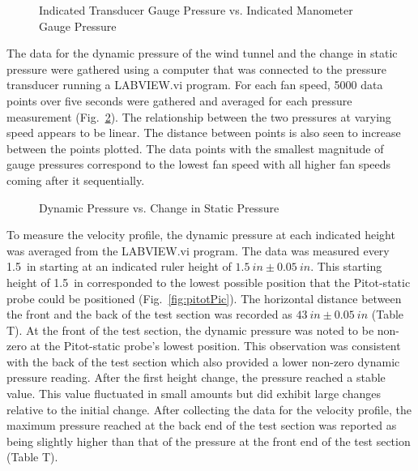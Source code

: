 \documentclass[journal,letterpaper]{IEEEtran}
\begin{document}
\begin{figure}[H]
    \centering
    
    \caption{Indicated Transducer Gauge Pressure vs. Indicated Manometer Gauge Pressure}
    \label{fig:calibration}
\end{figure}

The data for the dynamic pressure of the wind tunnel and the change in static pressure were gathered using a computer that was connected to the pressure transducer running a LABVIEW.vi program.
For each fan speed, 5000 data points over five seconds were gathered and averaged for each pressure measurement (Fig.~\ref{fig:data}).
The relationship between the two pressures at varying speed appears to be linear.
The distance between points is also seen to increase between the points plotted.
The data points with the smallest magnitude of gauge pressures correspond to the lowest fan speed with all higher fan speeds coming after it sequentially.

\begin{figure}[H]
    \centering
    
    \caption{Dynamic Pressure vs. Change in Static Pressure}
    \label{fig:data}
\end{figure}

To measure the velocity profile, the dynamic pressure at each indicated height was averaged from the LABVIEW.vi program.
The data was measured every \qty{1.5}{in} starting at an indicated ruler height of $\qty{1.5}{in} \pm \qty{0.05}{in}$.
This starting height of \qty{1.5}{in} corresponded to the lowest possible position that the Pitot-static probe could be positioned (Fig.~\ref{fig:pitotPic}).
The horizontal distance between the front and the back of the test section was recorded as $\qty{43}{in} \pm \qty{0.05}{in}$ (Table T).
At the front of the test section, the dynamic pressure was noted to be non-zero at the Pitot-static probe's lowest position.
This observation was consistent with the back of the test section which also provided a lower non-zero dynamic pressure reading.
After the first height change, the pressure reached a stable value.
This value fluctuated in small amounts but did exhibit large changes relative to the initial change.
After collecting the data for the velocity profile, the maximum pressure reached at the back end of the test section was reported as being slightly higher than that of the pressure at the front end of the test section (Table T).
\end{document}
